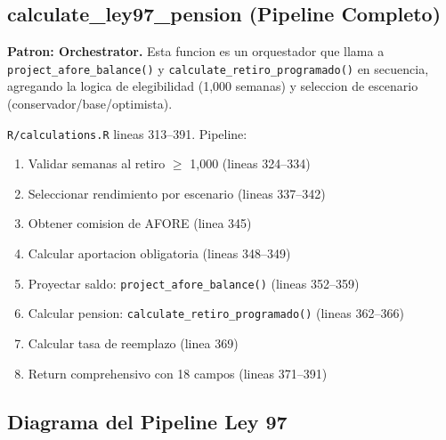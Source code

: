 \documentclass[11pt, letterpaper, twoside]{report}
\begin{document}
\subsection{calculate\_ley97\_pension (Pipeline Completo)}

\begin{patronbox}
\textbf{Patron: Orchestrator.} Esta funcion es un orquestador que llama a
\texttt{project\_afore\_balance()} y \texttt{calculate\_retiro\_programado()}
en secuencia, agregando la logica de elegibilidad (1,000 semanas) y
seleccion de escenario (conservador/base/optimista).
\end{patronbox}

\begin{codigobox}
\texttt{R/calculations.R} lineas 313--391. Pipeline:
\begin{enumerate}[nosep]
\item Validar semanas al retiro $\geq$ 1,000 (lineas 324--334)
\item Seleccionar rendimiento por escenario (lineas 337--342)
\item Obtener comision de AFORE (linea 345)
\item Calcular aportacion obligatoria (lineas 348--349)
\item Proyectar saldo: \texttt{project\_afore\_balance()} (lineas 352--359)
\item Calcular pension: \texttt{calculate\_retiro\_programado()} (lineas 362--366)
\item Calcular tasa de reemplazo (linea 369)
\item Return comprehensivo con 18 campos (lineas 371--391)
\end{enumerate}
\end{codigobox}


\subsection{Diagrama del Pipeline Ley 97}
\end{document}
